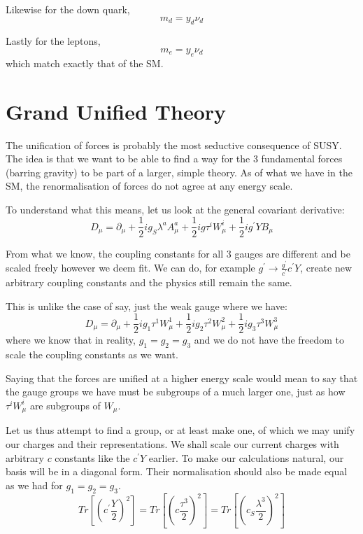 Likewise for the down quark,
\begin{equation}
    m_d = y_d \nu_d
\end{equation}

Lastly for the leptons,
\begin{equation}
    m_e = y_e \nu_d
\end{equation}
which match exactly that of the SM.

\section{Grand Unified Theory}
\label{sec:16:GUT}
The unification of forces is probably the most seductive consequence of SUSY. The idea is that we want to be able to find a way for the 3 fundamental forces (barring gravity) to be part of a larger, simple theory. As of what we have in the SM, the renormalisation of forces do not agree at any energy scale.

To understand what this means, let us look at the general covariant derivative:
\begin{equation}
    D_\mu = \partial_\mu + \frac{1}{2} i g_S \lambda^a A^a_\mu + \frac{1}{2} i g \tau^i W^i_\mu + \frac{1}{2} i g^\prime Y B_\mu
\end{equation}

From what we know, the coupling constants for all 3 gauges are different and be scaled freely however we deem fit. We can do, for example $g^\prime \rightarrow \frac{g^\prime}{c^\prime} c^\prime Y$, create new arbitrary coupling constants and the physics still remain the same.

This is unlike the case of say, just the weak gauge where we have:
\begin{equation}
    D_\mu = \partial_\mu + \frac{1}{2} i g_1 \tau^1 W^1_\mu + \frac{1}{2} i g_2 \tau^2 W^2_\mu + \frac{1}{2} i g_3 \tau^3 W^3_\mu 
\end{equation}
where we know that in reality, $g_1 = g_2 = g_3$ and we do not have the freedom to scale the coupling constants as we want. 

Saying that the forces are unified at a higher energy scale would mean to say that the gauge groups we have must be subgroups of a much larger one, just as how $\tau^i W^i_\mu$ are subgroups of $W_\mu$.

Let us thus attempt to find a group, or at least make one, of which we may unify our charges and their representations. We shall scale our current charges with arbitrary $c$ constants like the $c^\prime Y$ earlier. To make our calculations natural, our basis will be in a diagonal form. Their normalisation should also be made equal as we had for $g_1 = g_2 = g_3$.
\begin{equation}
    Tr\left[\left(c^\prime \frac{Y}{2} \right)^2 \right] = Tr\left[\left(c \frac{\tau^3}{2} \right)^2 \right] = Tr\left[\left(c_S \frac{\lambda^3}{2} \right)^2 \right]
\end{equation}

